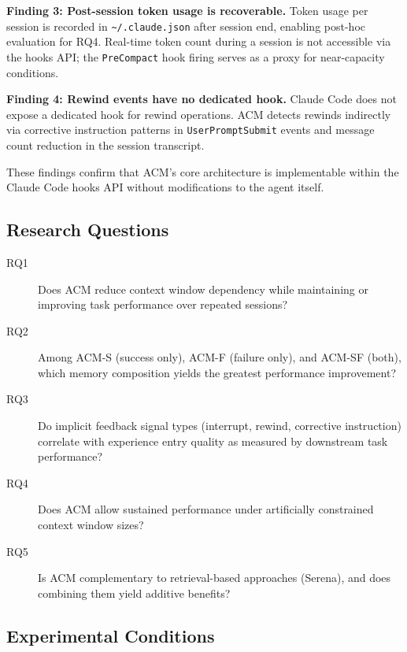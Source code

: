 \documentclass[conference]{IEEEtran}
\begin{document}
\textbf{Finding 3: Post-session token usage is recoverable.}
Token usage per session is recorded in \texttt{\textasciitilde/.claude.json} after session end, enabling post-hoc evaluation for RQ4. Real-time token count during a session is not accessible via the hooks API; the \texttt{PreCompact} hook firing serves as a proxy for near-capacity conditions.

\textbf{Finding 4: Rewind events have no dedicated hook.}
Claude Code does not expose a dedicated hook for rewind operations. ACM detects rewinds indirectly via corrective instruction patterns in \texttt{UserPromptSubmit} events and message count reduction in the session transcript.

These findings confirm that ACM's core architecture is implementable within the Claude Code hooks API without modifications to the agent itself.

\subsection{Research Questions}

\begin{description}
\item[RQ1] Does ACM reduce context window dependency while maintaining or improving task performance over repeated sessions?
\item[RQ2] Among ACM-S (success only), ACM-F (failure only), and ACM-SF (both), which memory composition yields the greatest performance improvement?
\item[RQ3] Do implicit feedback signal types (interrupt, rewind, corrective instruction) correlate with experience entry quality as measured by downstream task performance?
\item[RQ4] Does ACM allow sustained performance under artificially constrained context window sizes?
\item[RQ5] Is ACM complementary to retrieval-based approaches (Serena), and does combining them yield additive benefits?
\end{description}

\subsection{Experimental Conditions}
\end{document}
